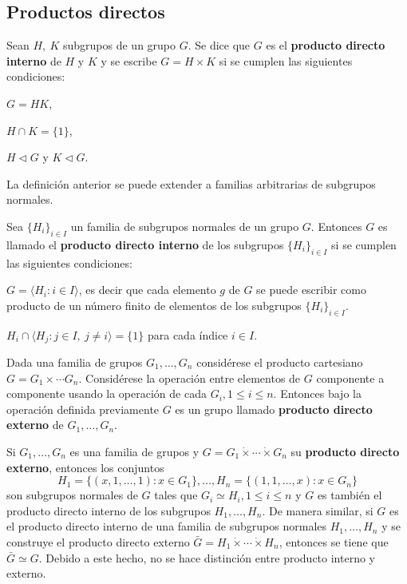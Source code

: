 \subsection{Productos directos}
\begin{definicion}
Sean $H,\ K$ subgrupos de un grupo $G$. Se dice que $G$ es el \textbf{producto directo interno} de $H$ y $K$ y se escribe $G = H \times K$ si se cumplen las siguientes condiciones:
\begin{bulletList}
\item $G=HK$,
\item $H \cap K = \{1\}$,
\item $H \triangleleft G$ y $K \triangleleft G$.
\end{bulletList}
\end{definicion}
La definición anterior se puede extender a familias arbitrarias de subgrupos normales.
\begin{definicion}
Sea $\{H_i\}_{i \in I}$ un familia de subgrupos normales de un grupo $G$. Entonces $G$ es llamado el \textbf{producto directo interno} de los subgrupos $\{H_i\}_{i \in I}$ si se cumplen las siguientes condiciones:
\begin{bulletList}
\item $G =\langle H_i \colon i \in I \rangle$, es decir que cada elemento $g$ de $G$ se puede escribir como producto de un número finito de elementos de los subgrupos $\{H_i\}_{i \in I}$.
\item $H_i \cap \langle H_j \colon j \in I, \ j \neq i \rangle = \{1\}$ para cada índice $i \in I$.
\end{bulletList}
\end{definicion}
\begin{definicion}
Dada una familia de grupos $G_1, \dots, G_n$ considérese el producto cartesiano $G = G_1 \times \cdots G_n$. Considérese la operación entre elementos de $G$ componente a componente usando la operación de cada $G_i, 1 \leq i \leq n$. Entonces bajo la operación definida previamente $G$ es un grupo llamado \textbf{producto directo externo} de $G_1, \dots, G_n$.
\end{definicion} 
Si $G_1, \dots, G_n$ es una familia de grupos y $G = G_1\dot{\times}\cdots\dot{\times}G_n$ su \textbf{producto directo externo}, entonces los conjuntos
\[ H_1=\{(x,1,\dots,1)\colon x \in G_1\},\dots,H_n=\{(1,1,\dots,x)\colon x \in G_n \} \] son subgrupos normales de $G$ tales que $G_i \simeq H_i,1\leq i \leq n$ y $G$ es también el producto directo interno de los subgrupos $H_1, \dots, H_n$.
De manera similar, si $G$ es el producto directo interno de una familia de subgrupos normales $H_1,\dots,H_n$ y se construye el producto directo externo $\bar{G} = H_1\dot{\times}\cdots\dot{\times}H_n$, entonces se tiene que $\bar{G} \simeq G$. Debido a este hecho, no se hace distinción entre producto interno y externo.
